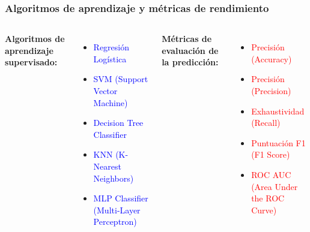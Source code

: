 \documentclass{beamer}
\begin{document}
\begin{frame}
	\frametitle{Algoritmos de aprendizaje y métricas de rendimiento}
	
\begin{columns}[t]
	\textbf{Algoritmos de aprendizaje supervisado:}
	\begin{itemize}
		\item \textcolor{blue}{Regresión Logística}
		\item \textcolor{blue}{SVM (Support Vector Machine)}
		\item \textcolor{blue}{Decision Tree Classifier}
		\item \textcolor{blue}{KNN (K-Nearest Neighbors)}
		\item \textcolor{blue}{MLP Classifier (Multi-Layer Perceptron)}
	\end{itemize}
	
	\textbf{Métricas de evaluación de la predicción:}
	\begin{itemize}
		\item \textcolor{red}{Precisión (Accuracy)}
		\item \textcolor{red}{Precisión (Precision)}
		\item \textcolor{red}{Exhaustividad (Recall)}
		\item \textcolor{red}{Puntuación F1 (F1 Score)}
		\item \textcolor{red}{ROC AUC (Area Under the ROC Curve)}
	\end{itemize}
	
\end{columns}
	
\end{frame}
%
%	
\end{document}
